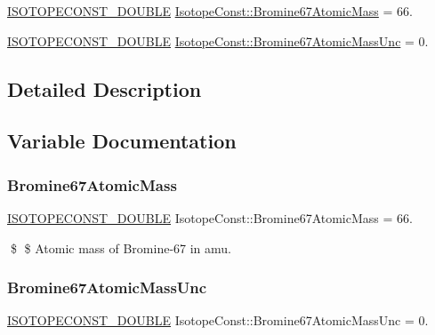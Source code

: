 \begin{DoxyCompactItemize}
\item 
\mbox{\hyperlink{group___isotope_const-_macros_ga8f45a7272ce02c0b4c65c44636ed719a}{I\+S\+O\+T\+O\+P\+E\+C\+O\+N\+S\+T\+\_\+\+D\+O\+U\+B\+LE}} \mbox{\hyperlink{group___isotope_const-_bromine-_br67_ga4aae14cd4d7b36ca619706fc94f302e8}{Isotope\+Const\+::\+Bromine67\+Atomic\+Mass}} = 66.
\item 
\mbox{\hyperlink{group___isotope_const-_macros_ga8f45a7272ce02c0b4c65c44636ed719a}{I\+S\+O\+T\+O\+P\+E\+C\+O\+N\+S\+T\+\_\+\+D\+O\+U\+B\+LE}} \mbox{\hyperlink{group___isotope_const-_bromine-_br67_gae97ed3410fe40b2e257131bdce3b3324}{Isotope\+Const\+::\+Bromine67\+Atomic\+Mass\+Unc}} = 0.
\end{DoxyCompactItemize}


\subsection{Detailed Description}


\subsection{Variable Documentation}
\mbox{\label{group___isotope_const-_bromine-_br67_ga4aae14cd4d7b36ca619706fc94f302e8}} 
\subsubsection{\texorpdfstring{Bromine67\+Atomic\+Mass}{Bromine67AtomicMass}}
{\footnotesize\ttfamily \mbox{\hyperlink{group___isotope_const-_macros_ga8f45a7272ce02c0b4c65c44636ed719a}{I\+S\+O\+T\+O\+P\+E\+C\+O\+N\+S\+T\+\_\+\+D\+O\+U\+B\+LE}} Isotope\+Const\+::\+Bromine67\+Atomic\+Mass = 66.}

\$ \$ Atomic mass of Bromine-\/67 in amu. \mbox{\label{group___isotope_const-_bromine-_br67_gae97ed3410fe40b2e257131bdce3b3324}} 
\subsubsection{\texorpdfstring{Bromine67\+Atomic\+Mass\+Unc}{Bromine67AtomicMassUnc}}
{\footnotesize\ttfamily \mbox{\hyperlink{group___isotope_const-_macros_ga8f45a7272ce02c0b4c65c44636ed719a}{I\+S\+O\+T\+O\+P\+E\+C\+O\+N\+S\+T\+\_\+\+D\+O\+U\+B\+LE}} Isotope\+Const\+::\+Bromine67\+Atomic\+Mass\+Unc = 0.}


